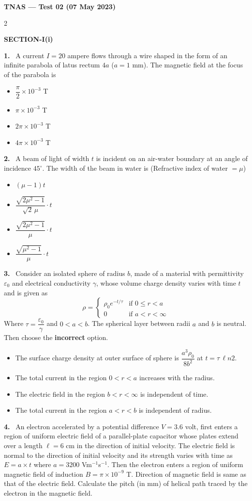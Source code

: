 \documentclass[10pt]{extarticle}
\newcommand{\papersec}[1]{\par\bigskip{\centering\Large\bfseries PAPER-#1\par}\medskip}
\newcommand{\partsec}[2]{\par\medskip\noindent{\large\bfseries PART-#1: #2}\par\smallskip}
\newcommand{\sect}[1]{\par\smallskip\noindent\textbf{#1}\par}
\newcommand{\qn}[1]{\par\smallskip\noindent\textbf{#1.}~}
\newenvironment{qoptions}{\begin{itemize}[leftmargin=1.8em,itemsep=1pt,topsep=2pt,label={}]}{\end{itemize}}
\newcommand{\opt}[2]{\item[(#1)] #2}
\begin{document}
\begin{center}{\Large\bfseries TNAS --- Test 02 (07 May 2023)}\end{center}
\begin{multicols}{2}
\raggedcolumns
\papersec{1}
\partsec{1}{PHYSICS}
\sect{SECTION-I(i)}
\qn{1} A current $I=20$ ampere flows through a wire shaped in the form of an infinite parabola of latus rectum $4a$ ($a=1$ mm). The magnetic field at the focus of the parabola is
\begin{qoptions}
\opt{A}{$\dfrac{\pi}{2}\times10^{-3}$ T}
\opt{B}{$\pi\times10^{-3}$ T}
\opt{C}{$2\pi\times10^{-3}$ T}
\opt{D}{$4\pi\times10^{-3}$ T}
\end{qoptions}
\qn{2} A beam of light of width $t$ is incident on an air-water boundary at an angle of incidence $45^\circ$. The width of the beam in water is (Refractive index of water $=\mu$)
\begin{qoptions}
\opt{A}{$(\mu-1)t$}
\opt{B}{$\dfrac{\sqrt{2\mu^2-1}}{\sqrt2\,\mu}\cdot t$}
\opt{C}{$\dfrac{\sqrt{2\mu^2-1}}{\mu}\cdot t$}
\opt{D}{$\dfrac{\sqrt{\mu^2-1}}{\mu}\cdot t$}
\end{qoptions}
\qn{3} Consider an isolated sphere of radius $b$, made of a material with permittivity $\varepsilon_0$ and electrical conductivity $\gamma$, whose volume charge density varies with time $t$ and is given as
\[\rho=\begin{cases}\rho_0e^{-t/\tau} & \text{if } 0\leqslant r<a\\ 0 & \text{if } a<r<\infty\end{cases}\]
Where $\tau=\dfrac{\varepsilon_0}{\gamma}$ and $0<a<b$. The spherical layer between radii $a$ and $b$ is neutral. Then choose the \textbf{incorrect} option.
\begin{qoptions}
\opt{A}{The surface charge density at outer surface of sphere is $\dfrac{a^3\rho_0}{8b^2}$ at $t=\tau\,\ell n2$.}
\opt{B}{The total current in the region $0<r<a$ increases with the radius.}
\opt{C}{The electric field in the region $b<r<\infty$ is independent of time.}
\opt{D}{The total current in the region $a<r<b$ is independent of radius.}
\end{qoptions}
\qn{4} An electron accelerated by a potential difference $V=3.6$ volt, first enters a region of uniform electric field of a parallel-plate capacitor whose plates extend over a length $\ell=6$ cm in the direction of initial velocity. The electric field is normal to the direction of initial velocity and its strength varies with time as $E=a\times t$ where $a=3200$ Vm$^{-1}$s$^{-1}$. Then the electron enters a region of uniform magnetic field of induction $B=\pi\times10^{-9}$ T. Direction of magnetic field is same as that of the electric field. Calculate the pitch (in mm) of helical path traced by the electron in the magnetic field.\\

\end{multicols}
\end{document}
